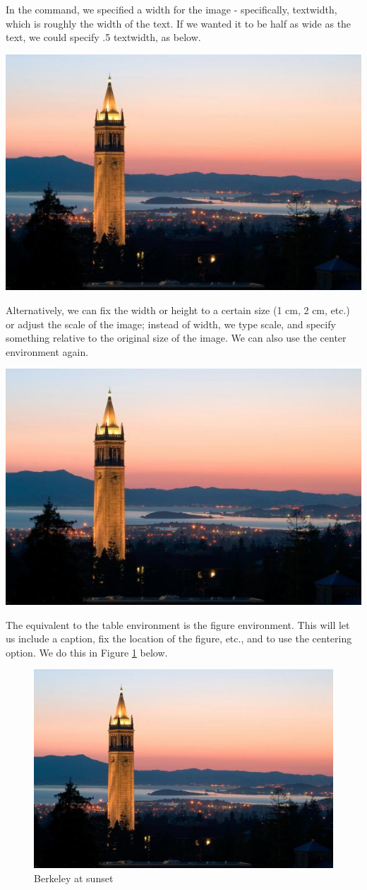 \documentclass{article}
\begin{document}
In the command, we specified a width for the image - specifically, textwidth, which is roughly the width of the text. If we wanted it to be half as wide as the text, we could specify .5 textwidth, as below.

\includegraphics[width=.5\textwidth]{campanile.jpg}

Alternatively, we can fix the width or height to a certain size (1 cm, 2 cm, etc.) or adjust the scale of the image; instead of width, we type scale, and specify something relative to the original size of the image. We can also use the center environment again.

\begin{center}
	\includegraphics[scale=.5]{campanile.jpg}
\end{center}

The equivalent to the table environment is the figure environment. This will let us include a caption, fix the location of the figure, etc., and to use the centering option. We do this in Figure \ref{berkeley1} below. 

\begin{figure}[h!]
	\centering	
	\includegraphics[width=.5\textwidth]{campanile.jpg}
	\caption{Berkeley at sunset}\label{berkeley1}
\end{figure}
\end{document}
